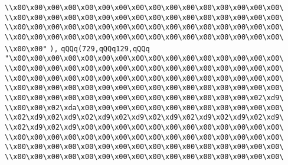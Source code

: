 \verb|\\x00\x00\x00\x00\x00\x00\x00\x00\x00\x00\x00\x00\x00\x00\x00\x00\|\newline
\verb|\\x00\x00\x00\x00\x00\x00\x00\x00\x00\x00\x00\x00\x00\x00\x00\x00\|\newline
\verb|\\x00\x00\x00\x00\x00\x00\x00\x00\x00\x00\x00\x00\x00\x00\x00\x00\|\newline
\verb|\\x00\x00\x00\x00\x00\x00\x00\x00\x00\x00\x00\x00\x00\x00\x00\x00\|\newline
\verb|\\x00\x00"|\newline
\verb|),|\newline
\verb|qQQq(729,qQQq129,qQQq|\newline
\verb|"\x00\x00\x00\x00\x00\x00\x00\x00\x00\x00\x00\x00\x00\x00\x00\x00\|\newline
\verb|\\x00\x00\x00\x00\x00\x00\x00\x00\x00\x00\x00\x00\x00\x00\x00\x00\|\newline
\verb|\\x00\x00\x00\x00\x00\x00\x00\x00\x00\x00\x00\x00\x00\x00\x00\x00\|\newline
\verb|\\x00\x00\x00\x00\x00\x00\x00\x00\x00\x00\x00\x00\x00\x00\x00\x00\|\newline
\verb|\\x00\x00\x00\x00\x00\x00\x00\x00\x00\x00\x00\x00\x00\x00\x02\xd9\|\newline
\verb|\\x00\x00\x02\xda\x00\x00\x00\x00\x00\x00\x00\x00\x00\x00\x00\x00\|\newline
\verb|\\x02\xd9\x02\xd9\x02\xd9\x02\xd9\x02\xd9\x02\xd9\x02\xd9\x02\xd9\|\newline
\verb|\\x02\xd9\x02\xd9\x00\x00\x00\x00\x00\x00\x00\x00\x00\x00\x00\x00\|\newline
\verb|\\x00\x00\x00\x00\x00\x00\x00\x00\x00\x00\x00\x00\x00\x00\x00\x00\|\newline
\verb|\\x00\x00\x00\x00\x00\x00\x00\x00\x00\x00\x00\x00\x00\x00\x00\x00\|\newline
\verb|\\x00\x00\x00\x00\x00\x00\x00\x00\x00\x00\x00\x00\x00\x00\x00\x00\|\newline
